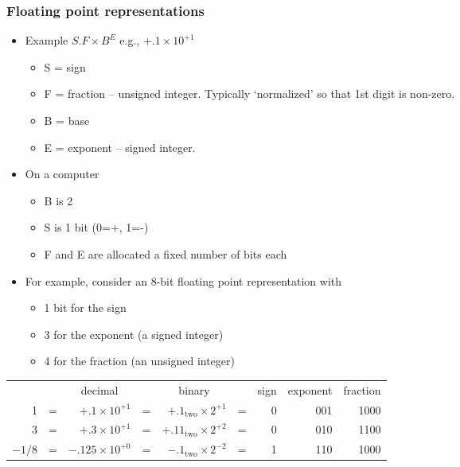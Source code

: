\documentclass[11pt,a4paper]{article}
\newcommand{\bc}{\begin{center}}
\newcommand{\ec}{\end{center}}
\begin{document}
\begin{frame}
	\frametitle{Floating point representations}

	\begin{itemize}
	    \item Example $S .F \times B^E$ e.g., $+.1 \times 10^{+1}$
	    \begin{itemize}
	        \item S = sign
	        \item F = fraction -- unsigned integer.  Typically `normalized' so that 1st digit is non-zero.
	        \item B = base
	        \item E = exponent -- signed integer.
	    \end{itemize}
	    \item On a computer
	    \begin{itemize}
	        \item B is 2
	        \item S is 1 bit (0=+, 1=-)
	        \item F and E are allocated a fixed number of bits each
	    \end{itemize}
	\end{itemize}
\end{frame}
\begin{frame}[fragile]
	\begin{itemize}
	    \item For example, consider an 8-bit floating point representation
	    with
	    \begin{itemize}
	        \item 1 bit for the sign
	        \item 3 for the exponent (a signed integer)
	        \item 4 for the fraction (an unsigned integer)
	    \end{itemize}
	\end{itemize}
	    \bc
	    {\tiny
	    \begin{tabular}{rcrcrcrrr}
	        & & \multicolumn{1}{c}{decimal} &   & \multicolumn{1}{c}{binary} & &
	            \multicolumn{1}{c}{sign} & \multicolumn{1}{c}{exponent} &
	            \multicolumn{1}{c}{fraction}\\
	        1 & = & $+.1 \times 10^{+1}$ & = & $+.1_{\mbox{two}} \times 2^{+1}$ & = &
	            0 & 001 & 1000\\
	        3 & = & $+.3 \times 10^{+1}$ & = & $+.11_{\mbox{two}} \times 2^{+2}$ & = &
	            0 & 010 & 1100\\
	    $-1/8$ & = & $-.125 \times 10^{+0}$ & = & $-.1_{\mbox{two}} \times 2^{-2}$ & = &
	            1 & 110 & 1000\\
	    \end{tabular}
	    }
	    \ec
\end{frame}
\end{document}
